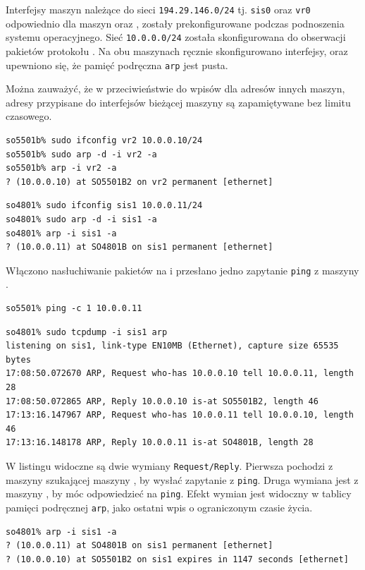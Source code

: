 Interfejsy maszyn należące do sieci \texttt{194.29.146.0/24} tj. \texttt{sis0}
oraz \texttt{vr0} odpowiednio dla maszyn \tjz{} oraz \tjj, zostały
prekonfigurowane podczas podnoszenia systemu operacyjnego. Sieć
\texttt{10.0.0.0/24} została skonfigurowana do obserwacji pakietów protokołu
\arp. Na obu maszynach ręcznie skonfigurowano interfejsy, oraz upewniono się, że
pamięć podręczna \texttt{arp} jest pusta.

Można zauważyć, że w przeciwieństwie do wpisów dla adresów innych maszyn, adresy
przypisane do interfejsów bieżącej maszyny są zapamiętywane bez limitu
czasowego.

\begin{lstlisting}
so5501b% sudo ifconfig vr2 10.0.0.10/24
so5501b% sudo arp -d -i vr2 -a
so5501b% arp -i vr2 -a
? (10.0.0.10) at SO5501B2 on vr2 permanent [ethernet]
\end{lstlisting}

\begin{lstlisting}
so4801% sudo ifconfig sis1 10.0.0.11/24
so4801% sudo arp -d -i sis1 -a
so4801% arp -i sis1 -a
? (10.0.0.11) at SO4801B on sis1 permanent [ethernet]
\end{lstlisting}

Włączono nasłuchiwanie pakietów \arp{} na \tjj{} i przesłano jedno zapytanie
\texttt{ping} z maszyny \tjz.

\begin{lstlisting}
so5501% ping -c 1 10.0.0.11
\end{lstlisting}

\begin{lstlisting}
so4801% sudo tcpdump -i sis1 arp
listening on sis1, link-type EN10MB (Ethernet), capture size 65535 bytes
17:08:50.072670 ARP, Request who-has 10.0.0.10 tell 10.0.0.11, length 28
17:08:50.072865 ARP, Reply 10.0.0.10 is-at SO5501B2, length 46
17:13:16.147967 ARP, Request who-has 10.0.0.11 tell 10.0.0.10, length 46
17:13:16.148178 ARP, Reply 10.0.0.11 is-at SO4801B, length 28
\end{lstlisting}

W listingu widoczne są dwie wymiany \texttt{Request/Reply}. Pierwsza pochodzi z
maszyny \tjz{} szukającej maszyny \tjj{}, by wysłać zapytanie z \texttt{ping}.
Druga wymiana jest z maszyny \tjj{}, by móc odpowiedzieć na \texttt{ping}. Efekt
wymian jest widoczny w tablicy pamięci podręcznej \texttt{arp}, jako ostatni
wpis o ograniczonym czasie życia.

\begin{lstlisting}
so4801% arp -i sis1 -a
? (10.0.0.11) at SO4801B on sis1 permanent [ethernet]
? (10.0.0.10) at SO5501B2 on sis1 expires in 1147 seconds [ethernet]
\end{lstlisting}
